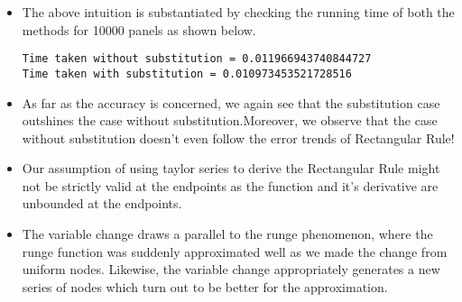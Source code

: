\documentclass[letterpaper]{exam}
\begin{document}
\begin{questions}
\begin{solution}
\begin{itemize}
    \item The above intuition is substantiated by checking the running time of both the methods for 10000 panels as shown below.
    \begin{verbatim}
Time taken without substitution = 0.011966943740844727
Time taken with substitution = 0.010973453521728516
    \end{verbatim}
    \item As far as the accuracy is concerned, we again see that the substitution case outshines the case without substitution.Moreover, we observe that the case without substitution doesn't even follow the error trends of Rectangular Rule!
    \item Our assumption of using taylor series to derive the Rectangular Rule might not be strictly valid at the endpoints as the function and it's derivative are unbounded at the endpoints.
    \item The variable change draws a parallel to the runge phenomenon, where the runge function was suddenly approximated well as we made the change from uniform nodes. Likewise, the variable change appropriately generates a new series of nodes which turn out to be better for the approximation.
\end{itemize}


\end{solution}
\end{questions}
\end{document}
